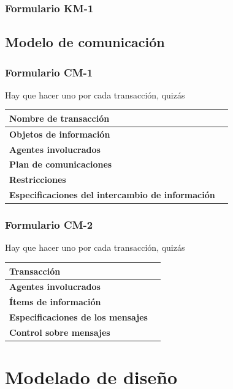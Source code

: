 \documentclass[a4paper,11pt]{article}
\begin{document}
			\subsubsection{Formulario KM-1}
		\subsection{Modelo de comunicación}
			\subsubsection{Formulario CM-1}
			Hay que hacer uno por cada transacción, quizás
			\begin{center}
				\begin{tabular}{| l | l |}
					\hline
					\textbf{Nombre de transacción} & \\
					\hline
					\textbf{Objetos de información} & \\
					\hline
					\textbf{Agentes involucrados} & \\
					\hline
					\textbf{Plan de comunicaciones} & \\
					\hline
					\textbf{Restricciones} & \\
					\hline
					\textbf{Especificaciones del intercambio de información} & \\
					\hline
				\end{tabular}
			\end{center}
			\subsubsection{Formulario CM-2}
			Hay que hacer uno por cada transacción, quizás
			\begin{center}
				\begin{tabular}{| l | l |}
					\hline
					\textbf{Transacción} & \\
					\hline
					\textbf{Agentes involucrados} & \\
					\hline
					\textbf{Ítems de información} & \\
					\hline
					\textbf{Especificaciones de los mensajes} & \\
					\hline
					\textbf{Control sobre mensajes} & \\
					\hline
				\end{tabular}
			\end{center}
	\section{Modelado de diseño}
\end{document}
